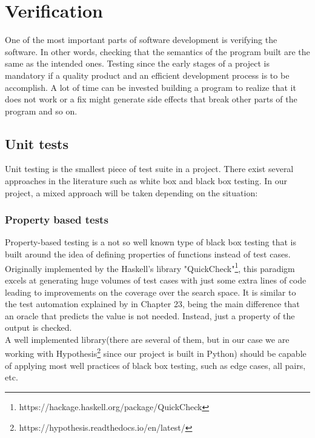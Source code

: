 \section{Verification}
  One of the most important parts of software development is verifying the
  software. In other words, checking that the semantics of the program built
  are the same as the intended ones. Testing since the early stages of a project
  is mandatory if a quality product and an efficient development
  process is to be accomplish.  A lot of time can be invested building a
  program to realize that it does not work or a fix might generate side effects that break other
  parts of the program and so on.
  \subsection{Unit tests}

    Unit testing is the smallest piece of test suite in a project. There exist
    several approaches in the literature such as white box and black box
    testing. In our project, a mixed approach will be taken depending on the
    situation:

    \subsubsection{Property based tests}

    Property-based testing is a not so well known type of black box testing that
    is built around the idea of defining properties of functions instead of
    test cases. Originally implemented by the Haskell's library
    "QuickCheck"\footnote{
    https://hackage.haskell.org/package/QuickCheck}, this paradigm excels at
    generating huge volumes of test cases with just some extra lines of code leading
    to improvements on the coverage over the search space. It is similar to the
    test automation explained by \citet{Sommerville} in Chapter 23, being the
    main difference that an oracle that predicts the value is not needed.
    Instead, just a property of the output is checked.\\

    A well implemented library(there are several of them, but in our case we are
    working with Hypothesis\footnote{https://hypothesis.readthedocs.io/en/latest/}
    since our project is built in Python) should be capable of applying most well
    practices of black box testing, such as edge cases, all pairs, etc.\\


